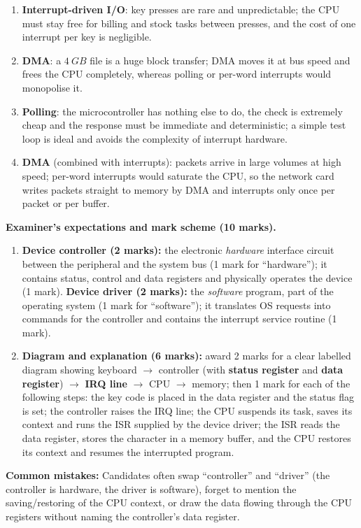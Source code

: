 \documentclass[11pt]{article}
\begin{document}
\begin{corrige}
\begin{enumerate}
\item \textbf{Interrupt-driven I/O}: key presses are rare and unpredictable; the CPU must stay free for billing and stock tasks between presses, and the cost of one interrupt per key is negligible.
\item \textbf{DMA}: a $\SI{4}{GB}$ file is a huge block transfer; DMA moves it at bus speed and frees the CPU completely, whereas polling or per-word interrupts would monopolise it.
\item \textbf{Polling}: the microcontroller has nothing else to do, the check is extremely cheap and the response must be immediate and deterministic; a simple test loop is ideal and avoids the complexity of interrupt hardware.
\item \textbf{DMA} (combined with interrupts): packets arrive in large volumes at high speed; per-word interrupts would saturate the CPU, so the network card writes packets straight to memory by DMA and interrupts only once per packet or per buffer.
\end{enumerate}
\end{corrige}

\begin{corrige}
\textbf{Examiner's expectations and mark scheme (10 marks).}
\begin{enumerate}
\item \textbf{Device controller (2 marks):} the electronic \emph{hardware} interface circuit between the peripheral and the system bus (1 mark for ``hardware''); it contains status, control and data registers and physically operates the device (1 mark). \textbf{Device driver (2 marks):} the \emph{software} program, part of the operating system (1 mark for ``software''); it translates OS requests into commands for the controller and contains the interrupt service routine (1 mark).
\item \textbf{Diagram and explanation (6 marks):} award 2 marks for a clear labelled diagram showing keyboard $\rightarrow$ controller (with \textbf{status register} and \textbf{data register}) $\rightarrow$ \textbf{IRQ line} $\rightarrow$ CPU $\rightarrow$ memory; then 1 mark for each of the following steps: the key code is placed in the data register and the status flag is set; the controller raises the IRQ line; the CPU suspends its task, saves its context and runs the ISR supplied by the device driver; the ISR reads the data register, stores the character in a memory buffer, and the CPU restores its context and resumes the interrupted program.
\end{enumerate}
\textbf{Common mistakes:} Candidates often swap ``controller'' and ``driver'' (the controller is hardware, the driver is software), forget to mention the saving/restoring of the CPU context, or draw the data flowing through the CPU registers without naming the controller's data register.
\end{corrige}
\end{document}
